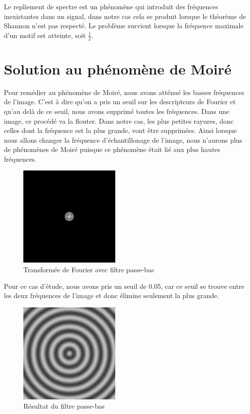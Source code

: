 \documentclass[a4paper,11pt]{article}
\begin{document}
  Le repliement de spectre est un phénomène qui introduit des fréquences inexistantes dans un signal, dans notre cas cela se produit lorsque le théorème de Shannon n’est pas respecté.
  Le problème survient lorsque la fréquence maximale d’un motif est atteinte, soit $\frac{1}{2}$.\\

  \section{Solution au phénomène de Moiré}
  
  Pour remédier au phénomène de Moiré, nous avons atténué les basses fréquences de l'image. C'est à dire qu'on a pris un
  seuil sur les descripteurs de Fourier et qu'au delà de ce seuil, nous avons supprimé toutes les fréquences. Dans une image,
  ce procédé va la flouter. Dans notre cas, les plus petites rayures, donc celles dont la fréquence est la plus grande,
  vont être supprimées. Ainsi lorsque nous allons changer la fréquence d'échantillonage de l'image, nous n'aurons plus de phénomènes
  de Moiré puisque ce phénomène était lié aux plus hautes fréquences.\\
  
  \begin{figure}[H]
  \center
   \includegraphics[width=5cm]{../FFT_1024_moire.png}
   \caption{Transformée de Fourier avec filtre passe-bas}
  \end{figure}
  
  Pour ce cas d'étude, nous avons pris un seuil de 0.05, car ce seuil se trouve entre les deux fréquences de l'image et donc 
  élimine seulement la plus grande.
  
  \begin{figure}[H]
  \center
   \includegraphics[width=5cm]{../1024_moire_hf.png}
   \caption{Résultat du filtre passe-bas}
  \end{figure}
  
\end{document}

